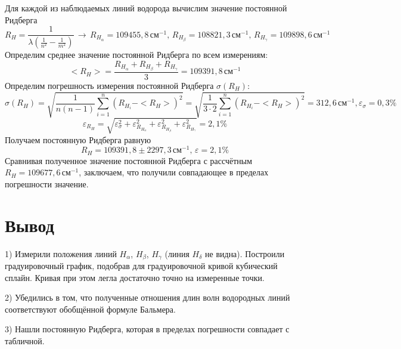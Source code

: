 \documentclass[a4paper,12pt]{article}
\begin{document}
Для каждой из наблюдаемых линий водорода вычислим значение постоянной Ридберга
\begin{equation*}
    R_{H}=\frac{1}{\lambda(\frac{1}{n^2}-\frac{1}{m^2})}\,\rightarrow\, R_{H_\alpha}=109455,8\, \text{см}^{-1},\, R_{H_\beta}=108821,3 \,\text{см}^{-1},\, R_{H_\gamma}=109898,6 \,\text{см}^{-1}
\end{equation*}
Определим среднее значение постоянной Ридберга по всем измерениям:
\begin{equation*}
    <R_H>=\frac{R_{H_\alpha}+R_{H_\beta}+R_{H_\gamma}}{3}=109391,8\,\text{см}^{-1}
\end{equation*}
Определим погрешность измерения постоянной Ридберга $\sigma(R_H)$:
\begin{equation*}
    \sigma(R_H)=\sqrt{\frac{1}{n(n-1)}\sum\limits_{i=1}^n(R_{H_i}-<R_H>)^2}=\sqrt{\frac{1}{3\cdot2}\sum\limits_{i=1}^n(R_{H_i}-<R_H>)^2}=312,6 \,\text{см}^{-1}, \varepsilon_\sigma=0,3\%
\end{equation*}
\begin{equation*}
    \varepsilon_{R_H}=\sqrt{\varepsilon_{\sigma}^2+\varepsilon_{R_{H_\alpha}}^2+\varepsilon_{R_{H_\beta}}^2+\varepsilon_{R_{H_\gamma}}^2}=2,1 \%
\end{equation*}
Получаем постоянную Ридберга равную
\begin{equation*}
    R_H=109391,8\pm2297,3\, \text{см}^{-1}, \,\varepsilon = 2,1\%
\end{equation*}
Сравнивая полученное значение постоянной Ридберга с рассчётным $R_H=109677,6 \,\text{см}^{-1}$,
заключаем, что получили совпадающее в пределах погрешности значение.
\section{Вывод}
1) Измерили положения линий $H_\alpha$, $H_\beta$, $H_\gamma$ (линия $H_\delta$ не видна). Построили градуировочный график, подобрав для градуировочной кривой кубический сплайн.
Кривая при этом легла достаточно точно на измеренные точки.

2) Убедились в том, что полученные отношения длин волн водородных линий
соответствуют обобщённой формуле Бальмера.

3) Нашли постоянную Ридберга, которая в пределах погрешности совпадает с табличной.


    
\end{document}
